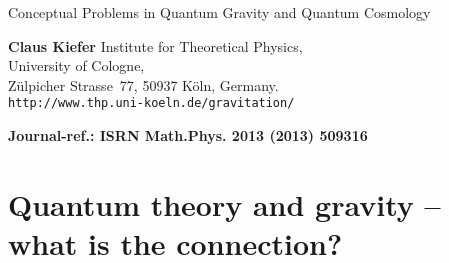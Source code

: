 \documentclass[12pt]{article}
\begin{document}
\begin{titlepage}

\noindent
\begin{center}
\vspace*{1cm}

{\large Conceptual Problems in Quantum Gravity and Quantum Cosmology}   
  
\vskip 1cm

{\bf Claus Kiefer} 
\vskip 0.4cm
Institute for Theoretical Physics,\\ University of Cologne, \\
Z\"ulpicher Strasse~77,
50937 K\"oln, Germany.\\ {\tt http://www.thp.uni-koeln.de/gravitation/}
\vspace{1cm}


\begin{abstract}
The search for a consistent and empirically established quantum theory
of gravity is among the biggest open problems of fundamental
physics. The obstacles are of formal and of conceptual nature. Here, I
address the main conceptual problems, discuss their present
status and outline further directions of research. For this purpose,
the main current approaches to quantum 
gravity are briefly reviewed and compared. 
\end{abstract}

\vskip 1cm

{\bf Journal-ref.: ISRN Math.Phys. 2013 (2013) 509316}
      

\end{center}

\end{titlepage}


\section{Quantum theory and gravity -- what is the connection?}
\end{document}
